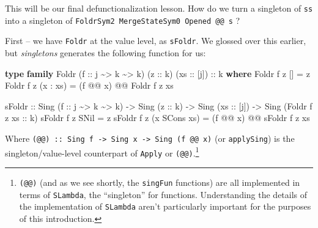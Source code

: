 \documentclass[]{article}
\newenvironment{Shaded}{}{}
\newcommand{\DataTypeTok}[1]{\textcolor[rgb]{0.56,0.13,0.00}{#1}}
\newcommand{\KeywordTok}[1]{\textcolor[rgb]{0.00,0.44,0.13}{\textbf{#1}}}
\newcommand{\NormalTok}[1]{#1}
\newcommand{\OperatorTok}[1]{\textcolor[rgb]{0.40,0.40,0.40}{#1}}
\newcommand{\OtherTok}[1]{\textcolor[rgb]{0.00,0.44,0.13}{#1}}
\begin{document}
This will be our final defunctionalization lesson. How do we turn a singleton of
\texttt{ss} into a singleton of
\texttt{FoldrSym2\ MergeStateSym0\ \textquotesingle{}Opened\ @@\ s} ?

First -- we have \texttt{Foldr} at the value level, as \texttt{sFoldr}. We
glossed over this earlier, but \emph{singletons} generates the following
function for us:

\begin{Shaded}
\begin{Highlighting}[]
\KeywordTok{type} \KeywordTok{family} \DataTypeTok{Foldr}\NormalTok{ (}\OtherTok{f ::}\NormalTok{ j }\OperatorTok{\textasciitilde{}\textgreater{}}\NormalTok{ k }\OperatorTok{\textasciitilde{}\textgreater{}}\NormalTok{ k) (}\OtherTok{z ::}\NormalTok{ k) (}\OtherTok{xs ::}\NormalTok{ [j])}\OtherTok{ ::}\NormalTok{ k }\KeywordTok{where}
    \DataTypeTok{Foldr}\NormalTok{ f z \textquotesingle{}[]       }\OtherTok{=}\NormalTok{ z}
    \DataTypeTok{Foldr}\NormalTok{ f z (x \textquotesingle{}}\OperatorTok{:}\NormalTok{ xs) }\OtherTok{=}\NormalTok{ (f }\OperatorTok{@@}\NormalTok{ x) }\OperatorTok{@@} \DataTypeTok{Foldr}\NormalTok{ f z xs}

\NormalTok{sFoldr}
\OtherTok{    ::} \DataTypeTok{Sing}\NormalTok{ (}\OtherTok{f ::}\NormalTok{ j }\OperatorTok{\textasciitilde{}\textgreater{}}\NormalTok{ k }\OperatorTok{\textasciitilde{}\textgreater{}}\NormalTok{ k)}
    \OtherTok{{-}\textgreater{}} \DataTypeTok{Sing}\NormalTok{ (}\OtherTok{z ::}\NormalTok{ k)}
    \OtherTok{{-}\textgreater{}} \DataTypeTok{Sing}\NormalTok{ (}\OtherTok{xs ::}\NormalTok{ [j])}
    \OtherTok{{-}\textgreater{}} \DataTypeTok{Sing}\NormalTok{ (}\DataTypeTok{Foldr}\NormalTok{ f z}\OtherTok{ xs ::}\NormalTok{ k)}
\NormalTok{sFoldr f z }\DataTypeTok{SNil}           \OtherTok{=}\NormalTok{ z}
\NormalTok{sFoldr f z (x }\OtherTok{\textasciigrave{}SCons\textasciigrave{}}\NormalTok{ xs) }\OtherTok{=}\NormalTok{ (f }\OperatorTok{@@}\NormalTok{ x) }\OperatorTok{@@}\NormalTok{ sFoldr f z xs}
\end{Highlighting}
\end{Shaded}

Where
\texttt{(@@)\ ::\ Sing\ f\ -\textgreater{}\ Sing\ x\ -\textgreater{}\ Sing\ (f\ @@\ x)}
(or \texttt{applySing}) is the singleton/value-level counterpart of
\texttt{Apply} or \texttt{(@@)}.\footnote{\texttt{(@@)} (and as we see shortly,
  the \texttt{singFun} functions) are all implemented in terms of
  \texttt{SLambda}, the ``singleton'' for functions. Understanding the details
  of the implementation of \texttt{SLambda} aren't particularly important for
  the purposes of this introduction.}
\end{document}
